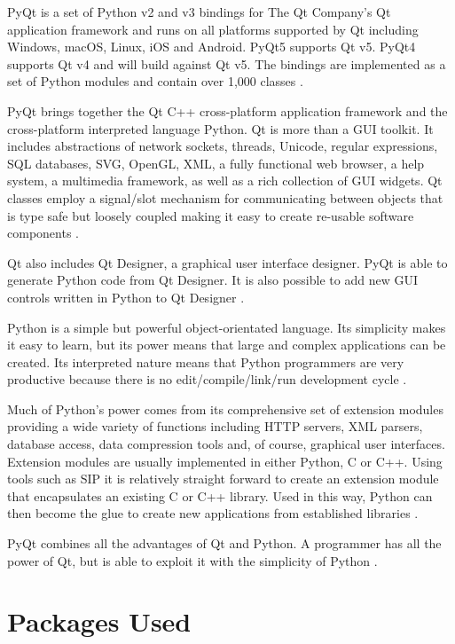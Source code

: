 	PyQt is a set of Python v2 and v3 bindings for The Qt Company's Qt application framework and runs on all platforms supported by Qt including Windows, macOS, Linux, iOS and Android. PyQt5 supports Qt v5. PyQt4 supports Qt v4 and will build against Qt v5. The bindings are implemented as a set of Python modules and contain over 1,000 classes \cite{pyqt_rbc}.
	
	PyQt brings together the Qt C++ cross-platform application framework and the cross-platform interpreted language Python.
	Qt is more than a GUI toolkit. It includes abstractions of network sockets, threads, Unicode, regular expressions, SQL databases, SVG, OpenGL, XML, a fully functional web browser, a help system, a multimedia framework, as well as a rich collection of GUI widgets.
	Qt classes employ a signal/slot mechanism for communicating between objects that is type safe but loosely coupled making it easy to create re-usable software components \cite{pyqt_rbc}.
	
	Qt also includes Qt Designer, a graphical user interface designer. PyQt is able to generate Python code from Qt Designer. It is also possible to add new GUI controls written in Python to Qt Designer \cite{pyqt_rbc}.
	
	Python is a simple but powerful object-orientated language. Its simplicity makes it easy to learn, but its power means that large and complex applications can be created. Its interpreted nature means that Python programmers are very productive because there is no edit/compile/link/run development cycle \cite{pyqt_rbc}.
	
	Much of Python's power comes from its comprehensive set of extension modules providing a wide variety of functions including HTTP servers, XML parsers, database access, data compression tools and, of course, graphical user interfaces. Extension modules are usually implemented in either Python, C or C++. Using tools such as SIP it is relatively straight forward to create an extension module that encapsulates an existing C or C++ library. Used in this way, Python can then become the glue to create new applications from established libraries \cite{pyqt_rbc}.
	
	PyQt combines all the advantages of Qt and Python. A programmer has all the power of Qt, but is able to exploit it with the simplicity of Python \cite{pyqt_rbc}.
	
	
	
	\section{Packages Used}
	\label{sec:packages_used}
	
